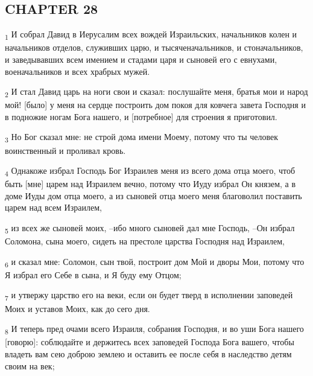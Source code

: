 \subsection{CHAPTER 28}
\begin{tcolorbox}
\textsubscript{1} И собрал Давид в Иерусалим всех вождей Израильских, начальников колен и начальников отделов, служивших царю, и тысяченачальников, и стоначальников, и заведывавших всем имением и стадами царя и сыновей его с евнухами, военачальников и всех храбрых мужей.
\end{tcolorbox}
\begin{tcolorbox}
\textsubscript{2} И стал Давид царь на ноги свои и сказал: послушайте меня, братья мои и народ мой! [было] у меня на сердце построить дом покоя для ковчега завета Господня и в подножие ногам Бога нашего, и [потребное] для строения я приготовил.
\end{tcolorbox}
\begin{tcolorbox}
\textsubscript{3} Но Бог сказал мне: не строй дома имени Моему, потому что ты человек воинственный и проливал кровь.
\end{tcolorbox}
\begin{tcolorbox}
\textsubscript{4} Однакоже избрал Господь Бог Израилев меня из всего дома отца моего, чтоб быть [мне] царем над Израилем вечно, потому что Иуду избрал Он князем, а в доме Иуды дом отца моего, а из сыновей отца моего меня благоволил поставить царем над всем Израилем,
\end{tcolorbox}
\begin{tcolorbox}
\textsubscript{5} из всех же сыновей моих, --ибо много сыновей дал мне Господь, --Он избрал Соломона, сына моего, сидеть на престоле царства Господня над Израилем,
\end{tcolorbox}
\begin{tcolorbox}
\textsubscript{6} и сказал мне: Соломон, сын твой, построит дом Мой и дворы Мои, потому что Я избрал его Себе в сына, и Я буду ему Отцом;
\end{tcolorbox}
\begin{tcolorbox}
\textsubscript{7} и утвержу царство его на веки, если он будет тверд в исполнении заповедей Моих и уставов Моих, как до сего дня.
\end{tcolorbox}
\begin{tcolorbox}
\textsubscript{8} И теперь пред очами всего Израиля, собрания Господня, и во уши Бога нашего [говорю]: соблюдайте и держитесь всех заповедей Господа Бога вашего, чтобы владеть вам сею доброю землею и оставить ее после себя в наследство детям своим на век;
\end{tcolorbox}
